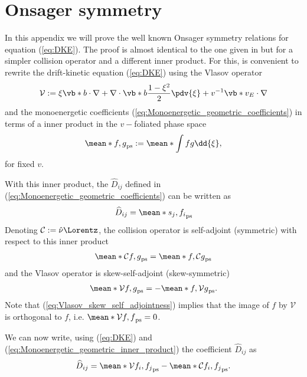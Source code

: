 \section{Onsager symmetry}
In this appendix we will prove the well known Onsager symmetry relations for equation (\ref{eq:DKE}). The proof is almost identical to the one given in \cite{Sugama_Entropy_Onsager} but for a simpler collision operator and a different inner product. For this, is convenient to rewrite the drift-kinetic equation (\ref{eq:DKE}) using the Vlasov operator
%
\begin{align}
	\mathcal{V} := \xi \vb*{b} \cdot \nabla + \nabla\cdot\vb*{b}\frac{1-\xi^2}{2}\pdv{\xi}  + v^{-1}\vb*{v}_E\cdot\nabla
\end{align}
and the monoenergetic coefficients (\ref{eq:Monoenergetic_geometric_coefficients}) in terms of a inner product in the $v-$foliated phase space
\begin{align}
	\mean*{f,g}_{\text{ps}} := \mean*{ \int  fg \dd{\xi}},
\end{align}
for fixed $v$.

With this inner product, the $\widehat{D}_{ij}$ defined in (\ref{eq:Monoenergetic_geometric_coefficients}) can be written as
%
\begin{align}
	\widehat{D}_{ij} = \mean*{s_j, f_i}_{\text{ps}}
	\label{eq:Monoenergetic_geometric_inner_product}
\end{align}
Denoting $\mathcal{C}:=\hat{\nu}\Lorentz$, the collision operator is self-adjoint (symmetric) with respect to this inner product
%
\begin{align}
	\mean*{\mathcal{C} f, g}_{\text{ps}} = \mean*{f, \mathcal{C} g}_{\text{ps}}
	\label{eq:Collision_self_adjointness}
\end{align}
and the Vlasov operator is skew-self-adjoint (skew-symmetric) 
%
\begin{align}
	\mean*{\mathcal{V} f, g}_{\text{ps}} = -\mean*{f, \mathcal{V} g}_{\text{ps}}.
	\label{eq:Vlasov_skew_self_adjointness}
\end{align}
Note that (\ref{eq:Vlasov_skew_self_adjointness}) implies that the image of $f$ by $\mathcal{V}$ is orthogonal to $f$, i.e. $\mean*{\mathcal{V} f, f}_{\text{ps}} =0$.

We can now write, using (\ref{eq:DKE}) and (\ref{eq:Monoenergetic_geometric_inner_product}) the coefficient $\widehat{D}_{ij}$ as
%
\begin{align}
	\widehat{D}_{ij} = \mean*{\mathcal{V} f_i, f_j}_{\text{ps}} - \mean*{\mathcal{C} f_i, f_j}_{\text{ps}}.
	\label{eq:Onsager_Dij}
\end{align}

